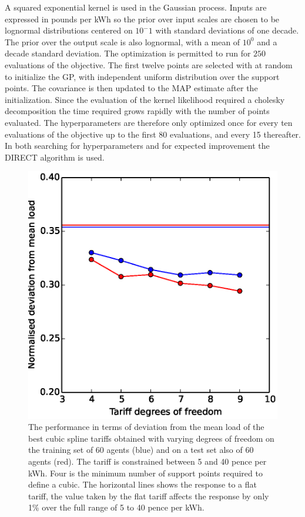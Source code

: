 \documentclass[a4paper, 10 pt, conference]{ieeeconf}  %
\begin{document}
A squared exponential kernel is used in the Gaussian process. Inputs are expressed in pounds per kWh so the  prior over input scales are chosen to be lognormal distributions centered on $10^-1$ with standard deviations of one decade. The prior over the output scale is also lognormal, with a mean of $10^0$ and a decade standard deviation. The optimization is permitted to run for $250$ evaluations of the objective. The first twelve points are selected with at random to initialize the GP, with independent uniform distribution over the support points. The covariance is then updated to the MAP estimate after the initialization. Since the evaluation of the kernel likelihood required a cholesky decomposition the time required grows rapidly with the number of points evaluated. The hyperparameters are therefore only optimized once for every ten evaluations of the objective up to the first 80 evaluations, and every 15 thereafter. In both searching for hyperparameters and for expected improvement the DIRECT algorithm is used.

\begin{figure}[htb]
\centering
\includegraphics[width=\columnwidth,trim =0cm 0cm 0cm 0cm,clip=True]{f2.eps}
\caption{The performance in terms of deviation from the mean load of the best cubic spline tariffs obtained with varying degrees of freedom on the training set of 60 agents (blue) and on a test set also of 60 agents (red). The tariff is constrained between 5 and 40 pence per kWh. Four is the minimum number of support points required to define a cubic. The horizontal lines shows the response to a flat tariff, the value taken by the flat tariff affects the response by only 1\% over the full range of 5 to 40 pence per kWh.}
\label{DOFplot}
\end{figure}
\end{document}
